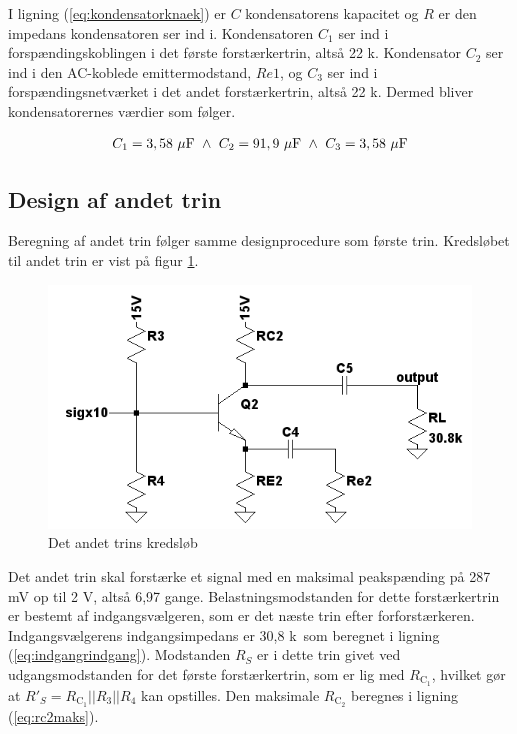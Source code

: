 I ligning (\ref{eq:kondensatorknaek}) er $C$ kondensatorens kapacitet og $R$ er den impedans kondensatoren ser ind i. Kondensatoren $C_1$ ser ind i forspændingskoblingen i det første forstærkertrin, altså 22 k\ohm. Kondensator $C_2$ ser ind i den AC-koblede emittermodstand, $Re1$, og $C_3$ ser ind i forspændingsnetværket i det andet forstærkertrin, altså 22 k\ohm. Dermed bliver kondensatorernes værdier som følger.

\begin{equation}
C_1=3,58~\mathrm{\mu F}~\wedge ~C_2=91,9~\mathrm{\mu F}~\wedge ~C_3=3,58~\mathrm{\mu F}
\end{equation}



\subsection*{Design af andet trin}
Beregning af andet trin følger samme designprocedure som første trin. Kredsløbet til andet trin er vist på figur \ref{fig:andettrinkreds}.

\begin{figure}[h]
\centering
\includegraphics[scale=.4]{teknisk/forforstaerker/andettrinkreds.png}
\caption{Det andet trins kredsløb}
\label{fig:andettrinkreds}
\end{figure}

Det andet trin skal forstærke et signal med en maksimal peakspænding på 287 mV op til 2 V, altså 6,97 gange. Belastningsmodstanden for dette forstærkertrin er bestemt af indgangsvælgeren, som er det næste trin efter forforstærkeren. Indgangsvælgerens indgangsimpedans er 30,8 k\ohm~som beregnet i ligning (\ref{eq:indgangrindgang}). Modstanden $R_S$ er i dette trin givet ved udgangsmodstanden for det første forstærkertrin, som er lig med $R_{\mathrm{C_1}}$, hvilket gør at $R'_S = R_{\mathrm{C_1}} || R_3 || R_4$ kan opstilles. Den maksimale $R_{\mathrm{C_2}}$ beregnes i ligning (\ref{eq:rc2maks}).

